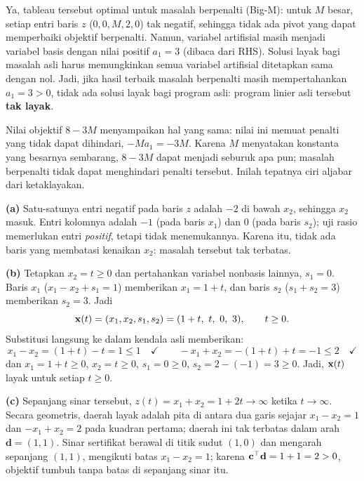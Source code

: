 
Ya, tableau tersebut optimal untuk masalah berpenalti (Big-M): untuk $M$ besar,
setiap entri baris $z$ ($0, 0, M, 2, 0$) tak negatif, sehingga tidak ada pivot
yang dapat memperbaiki objektif berpenalti. Namun, variabel artifisial masih
menjadi variabel basis dengan nilai positif $a_1 = 3$ (dibaca dari RHS). Solusi
layak bagi masalah asli harus memungkinkan semua variabel artifisial ditetapkan
sama dengan nol. Jadi, jika hasil terbaik masalah berpenalti masih mempertahankan
$a_1 = 3 > 0$, tidak ada solusi layak bagi program asli: program linier asli
tersebut \textbf{tak layak}.

Nilai objektif $8 - 3M$ menyampaikan hal yang sama: nilai ini memuat penalti
yang tidak dapat dihindari, $-M a_1 = -3M$. Karena $M$ menyatakan konstanta
yang besarnya sembarang, $8 - 3M$ dapat menjadi seburuk apa pun; masalah
berpenalti tidak dapat menghindari penalti tersebut. Inilah tepatnya ciri
aljabar dari ketaklayakan.


\textbf{(a)} Satu-satunya entri negatif pada baris $z$ adalah $-2$ di bawah
$x_2$, sehingga $x_2$ masuk. Entri kolomnya adalah $-1$ (pada baris $x_1$)
dan $0$ (pada baris $s_2$); uji rasio memerlukan entri \emph{positif}, tetapi
tidak menemukannya. Karena itu, tidak ada baris yang membatasi kenaikan $x_2$:
masalah tersebut tak terbatas.

\textbf{(b)} Tetapkan $x_2 = t \geq 0$ dan pertahankan variabel nonbasis
lainnya, $s_1 = 0$. Baris $x_1$ ($x_1 - x_2 + s_1 = 1$) memberikan
$x_1 = 1 + t$,
dan baris $s_2$ ($s_1 + s_2 = 3$) memberikan $s_2 = 3$. Jadi
\[
\mathbf{x}(t) = (x_1, x_2, s_1, s_2) = (1 + t,\ t,\ 0,\ 3), \qquad t \geq 0.
\]
Substitusi langsung ke dalam kendala asli memberikan:
\[
x_1 - x_2 = (1 + t) - t = 1 \leq 1 \quad\checkmark
\qquad
-x_1 + x_2 = -(1 + t) + t = -1 \leq 2 \quad\checkmark
\]
dan $x_1 = 1 + t \geq 0$, $x_2 = t \geq 0$, $s_1 = 0 \geq 0$,
$s_2 = 2 - (-1) = 3 \geq 0$. Jadi, $\mathbf{x}(t)$ layak untuk setiap
$t \geq 0$.

\textbf{(c)} Sepanjang sinar tersebut,
$z(t) = x_1 + x_2 = 1 + 2t \to \infty$ ketika $t \to \infty$. Secara
geometris, daerah layak adalah pita di antara dua garis sejajar
$x_1 - x_2 = 1$ dan $-x_1 + x_2 = 2$ pada kuadran pertama; daerah ini tak
terbatas dalam arah $\mathbf{d} = (1, 1)$. Sinar sertifikat berawal di titik
sudut $(1, 0)$ dan mengarah sepanjang $(1, 1)$, mengikuti batas
$x_1 - x_2 = 1$; karena $\mathbf{c}^\top \mathbf{d} = 1 + 1 = 2 > 0$, objektif tumbuh
tanpa batas di sepanjang sinar itu.
